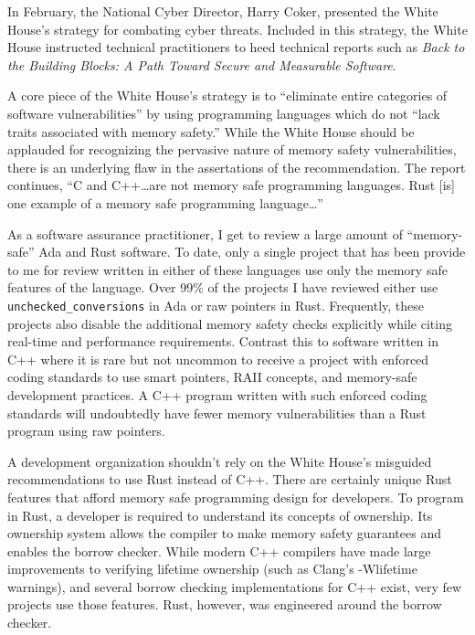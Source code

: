 In February, the National Cyber Director, Harry Coker, presented the White House's strategy for combating cyber threats. Included in this strategy, the White House instructed technical practitioners to heed technical reports such as \textit{Back to the Building Blocks: A Path Toward Secure and Measurable Software}.\autocite{20240902:coker}

A core piece of the White House's strategy is to ``eliminate entire categories of software vulnerabilities'' by using programming languages which do not ``lack traits associated with memory safety.''\autocite[\pno~7]{20240902:whitehouse} While the White House should be applauded for recognizing the pervasive nature of memory safety vulnerabilities, there is an underlying flaw in the assertations of the recommendation. The report continues, ``C and C++\ldots are not memory safe programming languages. Rust [is] one example of a memory safe programming language\ldots''\autocite[\pno~9]{20240902:whitehouse}

As a software assurance practitioner, I get to review a large amount of ``memory-safe'' Ada and Rust software. To date, only a single project that has been provide to me for review written in either of these languages use only the memory safe features of the language. Over 99\% of the projects I have reviewed either use \texttt{unchecked\_conversions} in Ada\autocite{20240902:hood} or raw pointers in Rust. Frequently, these projects also disable the additional memory safety checks explicitly while citing real-time and performance requirements. Contrast this to software written in C++ where it is rare but not uncommon to receive a project with enforced coding standards to use smart pointers, RAII concepts, and memory-safe development practices. A C++ program written with such enforced coding standards will undoubtedly have fewer memory vulnerabilities than a Rust program using raw pointers.

A development organization shouldn't rely on the White House's misguided recommendations to use Rust instead of C++. There are certainly unique Rust features that afford memory safe programming design for developers. To program in Rust, a developer is required to understand its concepts of ownership. Its ownership system allows the compiler to make memory safety guarantees and enables the borrow checker. While modern C++ compilers have made large improvements to verifying lifetime ownership (such as Clang's -Wlifetime warnings), and several borrow checking implementations for C++ exist, very few projects use those features. Rust, however, was engineered around the borrow checker.

